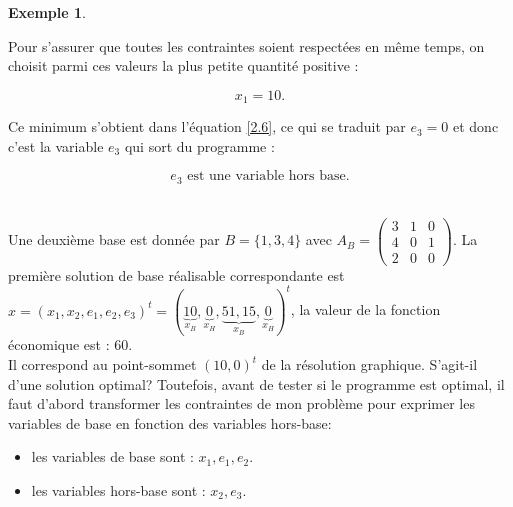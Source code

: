 \documentclass[a4paper,12pt,openany]{book}
\theoremstyle{plain}
\theoremstyle{definition}
\newtheorem{exemple}[theorem]{Exemple}
\theoremstyle{remark}
\theoremstyle{nbstyle}
\begin{document}
\begin{exemple}
\begin{description}
			
			Pour s'assurer que toutes les contraintes soient respectées en même temps, on choisit parmi ces valeurs la plus petite quantité positive :
			
			$$
			x_{1}=10 .
			$$
			
			Ce minimum s'obtient dans l'équation \eqref{2.6}, ce qui se traduit par $e_{3}=0$ et donc c'est la variable $e_{3}$ qui sort du programme :
			
			\begin{equation}
			e_{3}\text{ est une variable hors base.}
			\end{equation}
			
			\item[Détermination de la nouvelle solution : solution de base № 2]\quad\\
			Une deuxième base est donnée par $B=\{1,3,4\}$ avec $A_{B}=\left(\begin{array}{lll}3 & 1 & 0 \\ 4 & 0 & 1 \\ 2 & 0 & 0\end{array}\right)$. La première solution de base réalisable correspondante est $x=\left(x_{1}, x_{2}, e_{1}, e_{2}, e_{3}\right)^{t}=(\underbrace{10}_{x_{B}}, \underbrace{0}_{x_{H}}, \underbrace{51,15}_{x_{B}}, \underbrace{0}_{x_{H}})^{t}$, la valeur de la fonction économique est : 60.\\
			Il correspond au point-sommet $(10,0)^{t}$ de la résolution graphique. S'agit-il d'une solution optimal? Toutefois, avant de tester si le programme est optimal, il faut d'abord transformer les contraintes de mon problème pour exprimer les variables de base en fonction des variables hors-base:
			
			\begin{itemize}
				\item les variables de base sont : $x_{1}, e_{1}, e_{2}$.
				\item les variables hors-base sont : $x_{2}, e_{3}$.
			\end{itemize}
			

\end{description}
\end{exemple}
\end{document}
